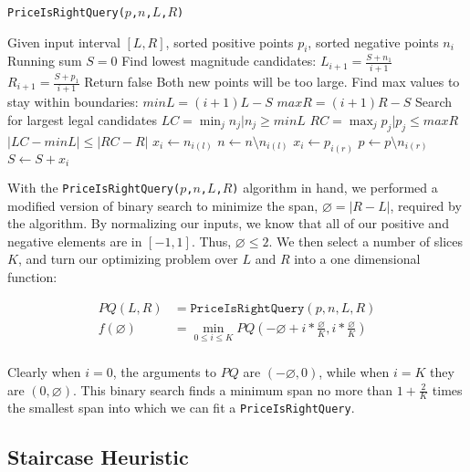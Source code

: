 \documentclass[11pt,twocolumn]{article}
\begin{document}
\begin{algorithm}
\caption{ \texttt{PriceIsRightQuery($p$,$n$,$L$,$R$)} }
\label{alg:priceIsRight}
\begin{algorithmic}
\State Given input interval $[L,R]$, sorted positive points $p_i$, sorted negative points $n_i$
\State Running sum $S = 0$
\State Find lowest magnitude candidates:
\State $L_{i+1} = \frac{S + n_1}{i+1}$
\State $R_{i+1} = \frac{S + p_1}{i+1}$
\State Return false 
\State Both new points will be too large.
\EndIf
\State Find max values to stay within boundaries:  
\State $minL = (i+1)L - S$
\State $maxR = (i+1)R - S$
\State Search for largest legal candidates
\State $LC = \min_j n_j | n_j \geq minL$
\State $RC = \max_j p_j | p_j \leq maxR$
\If $|LC - minL | \leq |RC - R|$
\State $x_i \leftarrow n_{i(l)}$
\State $n   \leftarrow n \setminus n_{i(l)}$ 
\Else
\State $x_i \leftarrow p_{i(r)}$
\State $p   \leftarrow p \setminus n_{i(r)}$ 
\EndIf
\State $S \leftarrow S + x_i$
\EndFor
\end{algorithmic}
\end{algorithm}

With the \texttt{PriceIsRightQuery($p$,$n$,$L$,$R$)} algorithm in hand, we performed a modified version of binary search to minimize the span, $\diameter = |R-L|$, required by the algorithm.  By normalizing our inputs, we know that all of our positive and negative elements are in $[-1,1]$.  Thus, $\diameter \leq 2$.  We then select a number of slices $K$, and turn our optimizing problem over $L$ and $R$ into a one dimensional function:

\begin{align*}
PQ(L,R) &= \texttt{PriceIsRightQuery}(p,n,L,R) \\
f(\diameter) &= \min_{0 \leq i \leq K} PQ(-\diameter+i*\frac{\diameter}{K},i*\frac{\diameter}{K} ) \\
\end{align*}

Clearly when $i=0$, the arguments to $PQ$ are $(-\diameter,0)$, while when $i=K$ they are $(0,\diameter)$.  This binary search finds a minimum span no more than $1+\frac{2}{K}$ times the smallest span into which we can fit a \texttt{PriceIsRightQuery}.

\subsection{Staircase Heuristic} \label{subs:Staircase}
\end{document}
